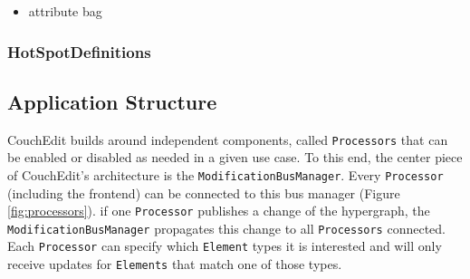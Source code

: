 \begin{itemize}
  \item attribute bag
\end{itemize}

\subsubsection{HotSpotDefinitions}


\subsection{Application Structure}
CouchEdit builds around independent components, called \texttt{Processors} that can be enabled or disabled as needed in a given use case. To this end, the center piece of CouchEdit's architecture is the \texttt{ModificationBusManager}. Every \texttt{Processor} (including the frontend) can be connected to this bus manager (Figure \ref{fig:processors}). if one \texttt{Processor} publishes a change of the hypergraph, the \texttt{ModificationBusManager} propagates this change to all \texttt{Processors} connected. Each \texttt{Processor} can specify which \texttt{Element} types it is interested and will only receive updates for \texttt{Elements} that match one of those types. 



